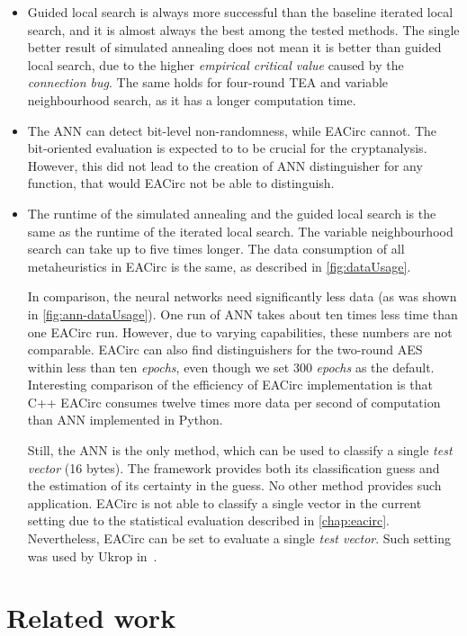 \documentclass[
    digital,    %
    oneside,    %
    color,
    11pt,
    nocover,
    notable,
    nolof,
    nolot,
]{fithesis3}
\begin{document}
\begin{itemize}
    \item Guided local search is always more successful than the baseline iterated local search, and it is almost always the best among the tested methods. The single better result of simulated annealing does not mean it is better than guided local search, due to the higher \textit{empirical critical value} caused by the \textit{connection bug}. The same holds for four-round TEA and variable neighbourhood search, as it has a longer computation time.
    \item The ANN can detect bit-level non-randomness, while EACirc cannot. The bit-oriented evaluation is expected to to be crucial for the cryptanalysis. However, this did not lead to the creation of ANN distinguisher for any function, that would EACirc not be able to distinguish.
    \item The runtime of the simulated annealing and the guided local search is the same as the runtime of the iterated local search. The variable neighbourhood search can take up to five times longer. The data consumption of all metaheuristics in EACirc is the same, as described in \cref{fig:dataUsage}.
    
    In comparison, the neural networks need significantly less data (as was shown in \cref{fig:ann-dataUsage}). One run of ANN takes about ten times less time than one EACirc run. However, due to varying capabilities, these numbers are not comparable. EACirc can also find distinguishers for the two-round AES within less than ten \textit{epochs}, even though we set 300 \textit{epochs} as the default. Interesting comparison of the efficiency of EACirc implementation is that C++ EACirc consumes twelve times more data per second of computation than ANN implemented in Python.
    
    Still, the ANN is the only method, which can be used to classify a single \textit{test vector} (16 bytes). The framework provides both its classification guess and the estimation of its certainty in the guess. No other method provides such application. EACirc is not able to classify a single vector in the current setting due to the statistical evaluation described in \cref{chap:eacirc}. Nevertheless, EACirc can be set to evaluate a single \textit{test vector}. Such setting was used by Ukrop in~\cite{ukropBcThesis}.
\end{itemize}

\chapter{Related work}
\label{chap:relatwork}
\end{document}
